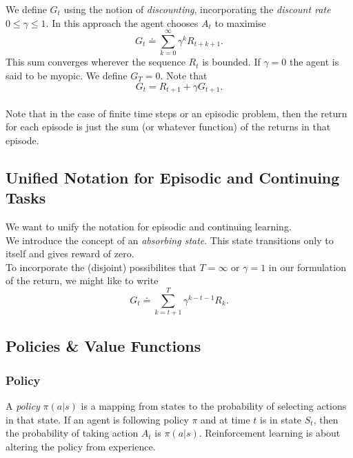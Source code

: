 We define $G_t$ using the notion of \emph{discounting}, incorporating the \emph{discount rate} $0 \leq \gamma \leq 1$. In this approach the agent chooses $A_t$ to maximise 
\begin{equation}
    G_t \doteq \sum_{k = 0}^{\infty} \gamma^k R_{t+k+1}.
\end{equation}
 This sum converges wherever the sequence $R_t$ is bounded. If $\gamma = 0$ the agent is said to be myopic. We define $G_T = 0$. Note that
\begin{equation}
     G_t = R_{t+1} + \gamma G_{t+1}.
\end{equation}\\

Note that in the case of finite time steps or an episodic problem, then the return for each episode is just the sum (or whatever function) of the returns in that episode.


\subsection{Unified Notation for Episodic and Continuing Tasks}
We want to unify the notation for episodic and continuing learning. \\

We introduce the concept of an \emph{absorbing state}. This state transitions only to itself and gives reward of zero.\\

To incorporate the (disjoint) possibilites that $T=\infty$ or $\gamma = 1$ in our formulation of the return, we might like to write
\begin{equation}
    G_t \doteq \sum_{k=t+1}^T \gamma^{k-t-1}R_k.
\end{equation}


\subsection{Policies \& Value Functions}
\subsubsection*{Policy}
A \emph{policy} $\pi(a|s)$ is a mapping from states to the probability of selecting actions in that state. If an agent is following policy $\pi$ and at time $t$ is in state $S_t$, then the probability of taking action $A_t$ is $\pi(a|s)$. Reinforcement learning is about altering the policy from experience.\\

